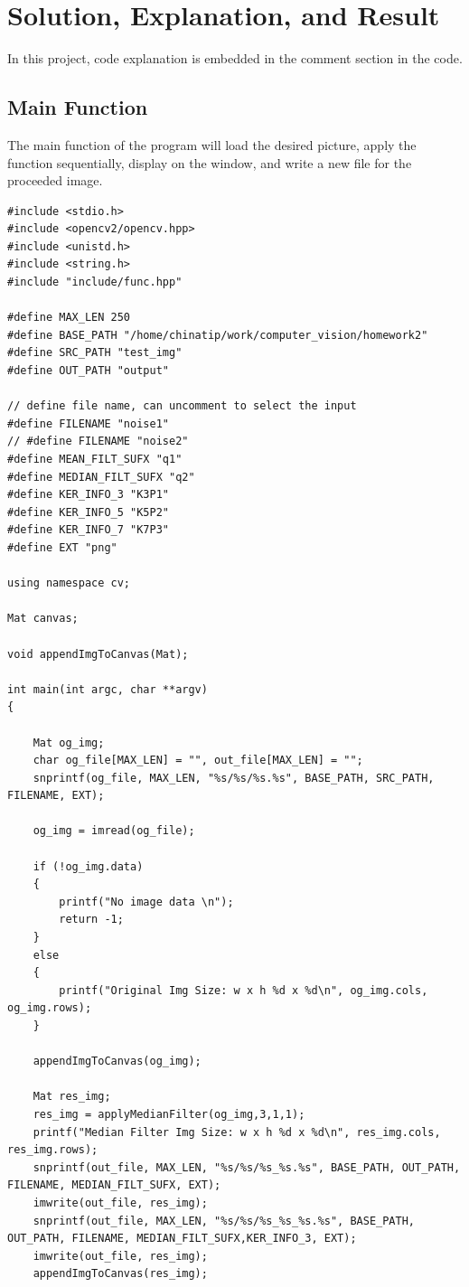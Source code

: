 \documentclass[12pt,a4paper]{report}
\begin{document}
\chapter{Solution, Explanation, and Result}
In this project, code explanation is embedded in the comment section in the code.

\section{Main Function}
The main function of the program will load the desired picture, apply the function sequentially, display on the window, and write a new file for the proceeded image.
\begin{lstlisting}
#include <stdio.h>
#include <opencv2/opencv.hpp>
#include <unistd.h>
#include <string.h>
#include "include/func.hpp"

#define MAX_LEN 250
#define BASE_PATH "/home/chinatip/work/computer_vision/homework2"
#define SRC_PATH "test_img"
#define OUT_PATH "output"

// define file name, can uncomment to select the input
#define FILENAME "noise1"
// #define FILENAME "noise2"
#define MEAN_FILT_SUFX "q1"
#define MEDIAN_FILT_SUFX "q2"
#define KER_INFO_3 "K3P1"
#define KER_INFO_5 "K5P2"
#define KER_INFO_7 "K7P3"
#define EXT "png"

using namespace cv;

Mat canvas;

void appendImgToCanvas(Mat);

int main(int argc, char **argv)
{

    Mat og_img;
    char og_file[MAX_LEN] = "", out_file[MAX_LEN] = "";
    snprintf(og_file, MAX_LEN, "%s/%s/%s.%s", BASE_PATH, SRC_PATH, FILENAME, EXT);

    og_img = imread(og_file);

    if (!og_img.data)
    {
        printf("No image data \n");
        return -1;
    }
    else
    {
        printf("Original Img Size: w x h %d x %d\n", og_img.cols, og_img.rows);
    }

    appendImgToCanvas(og_img);

    Mat res_img;
    res_img = applyMedianFilter(og_img,3,1,1);
    printf("Median Filter Img Size: w x h %d x %d\n", res_img.cols, res_img.rows);
    snprintf(out_file, MAX_LEN, "%s/%s/%s_%s.%s", BASE_PATH, OUT_PATH, FILENAME, MEDIAN_FILT_SUFX, EXT);
    imwrite(out_file, res_img);
    snprintf(out_file, MAX_LEN, "%s/%s/%s_%s_%s.%s", BASE_PATH, OUT_PATH, FILENAME, MEDIAN_FILT_SUFX,KER_INFO_3, EXT);
    imwrite(out_file, res_img);
    appendImgToCanvas(res_img);


\end{lstlisting}
\end{document}
